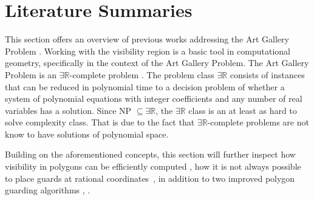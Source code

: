 \section{Literature Summaries}
\label{sec:literature}

This section offers an overview of previous works addressing the Art Gallery Problem \cite{o1987art}. 
Working with the visibility region is a basic tool in computational geometry, specifically in the context of the Art Gallery Problem. The Art Gallery Problem is an $\exists \mathbb R$-complete problem \cite{abrahamsen2021art}. The problem class $\exists \mathbb R$ consists of instances that can be reduced in polynomial time to a decision problem of whether a system of polynomial equations with integer coefficients and any number of real variables has a solution. Since NP $\subseteq \exists \mathbb R$, the $\exists \mathbb R$ class is an at least as hard to solve complexity class. That is due to the fact that $\exists \mathbb R$-complete problems are not know to have solutions of polynomial space. 

Building on the aforementioned concepts, this section will further inspect how visibility in polygons can be efficiently computed \cite{DBLP:journals/corr/BungiuHHHK14}, how it is not always possible to place guards at rational coordinates~\cite{abrahamsen2021art}, in addition to two improved polygon guarding algorithms \cite{maleki2022implementation}, \cite{DBLP:journals/corr/abs-2007-06920}.





\newpage

\newpage

